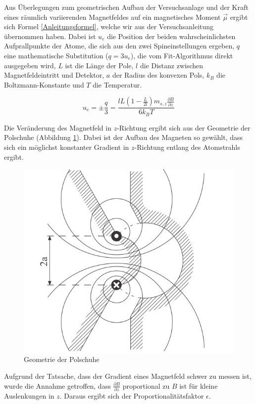 \documentclass[a4paper,parskip,11pt, DIV12]{scrreprt}
\begin{document}
Aus Überlegungen zum geometrischen Aufbau der Versuchsanlage und der Kraft eines räumlich variierenden Magnetfeldes auf ein magnetisches Moment $\vec{ \mu }$ ergibt sich Formel \ref{Anleitungsformel}, welche wir aus der Versuchsanleitung übernommen haben. Dabei ist $u_e$ die Position der beiden wahrscheinlichsten Aufprallpunkte der Atome, die sich aus den zwei Spineinstellungen ergeben, $q$ eine mathematische Substitution ($q=3u_e$), die vom Fit-Algorithmus direkt ausgegeben wird, $L$ ist die Länge der Pole, $l$ die Distanz zwischen Magnetfeldeintritt und Detektor, $a$ der Radius des konvexen Pols, $k_B$ die Boltzmann-Konstante und $T$ die Temperatur.


\begin{equation} \label{Anleitungsformel}
u_e=\pm \frac{q}{3}=\frac{lL(1-\frac{L}{2l})m_{s,z} \frac{\partial B}{\partial z}}{6k_BT}
\end{equation}

Die Veränderung des Magnetfeld in $z$-Richtung ergibt sich aus der Geometrie der Polschuhe (Abbildung \ref{Abb:Polschuhe}). Dabei ist der Aufbau des Magneten so gewählt, dass sich ein möglichst konstanter Gradient in $z$-Richtung entlang des Atomstrahls ergibt.

\begin{figure}[H]
\centering
\includegraphics[scale=0.7]{Polschuhe}
\caption[Polschuhe]{Geometrie der Polschuhe}
\label{Abb:Polschuhe}
\end{figure} Aufgrund der Tatsache, dass der Gradient eines Magnetfeld schwer zu messen ist, wurde die Annahme getroffen, dass $\frac{ \partial B}{ \partial z}$ proportional zu $B$ ist für kleine Auslenkungen in $z$. Daraus ergibt sich der Proportionalitätsfaktor $\epsilon$.
\end{document}
